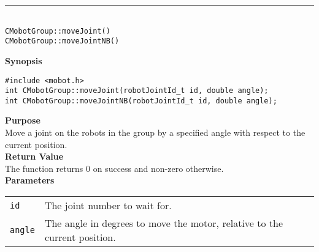\noindent
\vspace{5pt}
\rule{4.5in}{0.015in}\\
\noindent
{\LARGE \texttt{CMobotGroup::moveJoint()}}\\
{\LARGE \texttt{CMobotGroup::moveJointNB()}}\\
{}

\noindent
{\bf Synopsis}
\vspace{-8pt}
\begin{verbatim}
#include <mobot.h>
int CMobotGroup::moveJoint(robotJointId_t id, double angle);
int CMobotGroup::moveJointNB(robotJointId_t id, double angle);
\end{verbatim}

\noindent
{\bf Purpose}\\
Move a joint on the robots in the group by a specified angle with respect
to the current position.\\

\noindent
{\bf Return Value}\\
The function returns 0 on success and non-zero otherwise.\\

\noindent
{\bf Parameters}\\
\vspace{-0.1in}
\begin{description}
\item               
\begin{tabular}{p{10 mm}p{145 mm}}
\texttt{id} & The joint number to wait for. \\
\texttt{angle} & The angle in degrees to move the motor, relative to the current position.  \\
\end{tabular}
\end{description}

